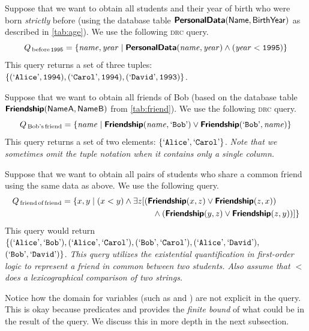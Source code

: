 \smallskip
\begin{example}
    Suppose that we want to obtain all students and their year of birth who were born \emph{strictly} before  (using the database table $\personaldata$ as described in \autoref{tab:age}). We use the following \textsc{drc} query.
    \[
        Q_\text{\,before\,\ensuremath{\text{\textnormal{\ttfamily{1995}}}}} = \{\mathit{name}, \mathit{year} \mid
            \text{\textnormal{\textsf{\textbf{PersonalData}}}}(\mathit{name}, \mathit{year}) \wedge (\mathit{year} < \text{\textnormal{\ttfamily{1995}}})\}
    \]
    This query returns a set of three tuples: $\{(\text{\textnormal{`\ttfamily{Alice}}'},\text{\textnormal{\ttfamily{1994}}}),(\text{\textnormal{`\ttfamily{Carol}}'},\text{\textnormal{\ttfamily{1994}}}),(\text{\textnormal{`\ttfamily{David}}'},\text{\textnormal{\ttfamily{1993}}})\}$.
\end{example}

\begin{example}
    Suppose that we want to obtain all friends of Bob (based on the database table $\friendship$ from \autoref{tab:friend}). We use the following \textsc{drc} query.
    \[
        Q_\text{\,Bob's\,friend} = \{\mathit{name} \mid
            \text{\textnormal{\textsf{\textbf{Friendship}}}}(\mathit{name}, \text{\textnormal{`\ttfamily{Bob}}'}) \vee
            \text{\textnormal{\textsf{\textbf{Friendship}}}}(\text{\textnormal{`\ttfamily{Bob}}'}, \mathit{name})\}
    \]
    This query returns a set of two elements: $\{\text{\textnormal{`\ttfamily{Alice}}'},\text{\textnormal{`\ttfamily{Carol}}'}\}$. \emph{Note that we sometimes omit the tuple notation when it contains only a single column.}
\end{example}

\newpage
\begin{example}
    Suppose that we want to obtain all pairs of students who share a common friend using the same data as above. We use the following query.
    \begin{align*}
        Q_\text{\,friend\,of\,friend} = \{ x, y \mid (x < y) \wedge \exists z[
                &(\text{\textnormal{\textsf{\textbf{Friendship}}}}(x, z) \vee \text{\textnormal{\textsf{\textbf{Friendship}}}}(z, x)) \\
                &\quad\wedge (\text{\textnormal{\textsf{\textbf{Friendship}}}}(y, z) \vee \text{\textnormal{\textsf{\textbf{Friendship}}}}(z, y))
            ]\}
    \end{align*}
    This query would return $\{(\text{\textnormal{`\ttfamily{Alice}}'},\text{\textnormal{`\ttfamily{Bob}}'}),(\text{\textnormal{`\ttfamily{Alice}}'},\text{\textnormal{`\ttfamily{Carol}}'}),(\text{\textnormal{`\ttfamily{Bob}}'},\text{\textnormal{`\ttfamily{Carol}}'}),(\text{\textnormal{`\ttfamily{Alice}}'},\text{\textnormal{`\ttfamily{David}}'}),$ $(\text{\textnormal{`\ttfamily{Bob}}'},\text{\textnormal{`\ttfamily{David}}'})\}$. \emph{This query utilizes the existential quantification in first-order logic to represent a friend in common between two students. Also assume that $<$ does a lexicographical comparison of two strings.}
\end{example}

\medskip
{}
\label{psec:explicit-domain}
Notice how the domain for variables (such as  and ) are not explicit in the query. This is okay because predicates  and  provides the \emph{finite bound} of what could be in the result of the query. We discuss this in more depth in the next subsection.


